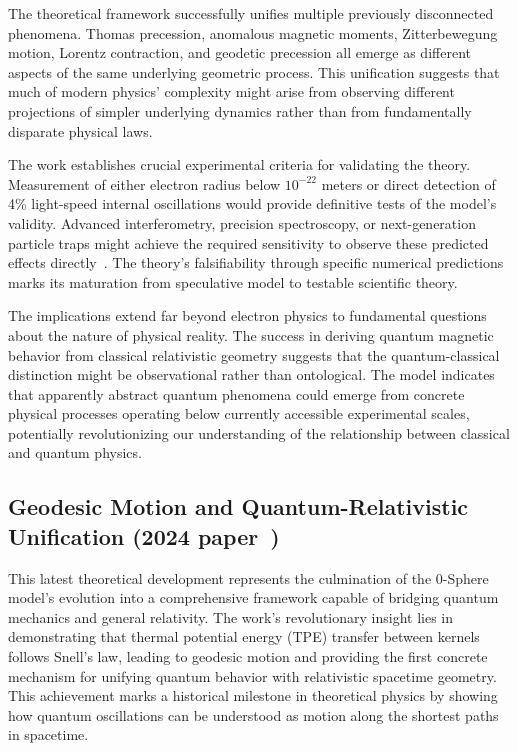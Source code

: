 \documentclass[%
 reprint,
 amsmath,amssymb,
 aps,
]{revtex4-1}
\numberwithin{equation}{section}%
\begin{document}
The theoretical framework successfully unifies multiple previously disconnected phenomena. Thomas precession, anomalous magnetic moments, Zitterbewegung motion, Lorentz contraction, and geodetic precession all emerge as different aspects of the same underlying geometric process. This unification suggests that much of modern physics' complexity might arise from observing different projections of simpler underlying dynamics rather than from fundamentally disparate physical laws.

The work establishes crucial experimental criteria for validating the theory. Measurement of either electron radius below $10^{-22}$ meters or direct detection of 4\% light-speed internal oscillations would provide definitive tests of the model's validity. Advanced interferometry, precision spectroscopy, or next-generation particle traps might achieve the required sensitivity to observe these predicted effects directly~\cite{dehmelt1988}. The theory's falsifiability through specific numerical predictions marks its maturation from speculative model to testable scientific theory.

The implications extend far beyond electron physics to fundamental questions about the nature of physical reality. The success in deriving quantum magnetic behavior from classical relativistic geometry suggests that the quantum-classical distinction might be observational rather than ontological. The model indicates that apparently abstract quantum phenomena could emerge from concrete physical processes operating below currently accessible experimental scales, potentially revolutionizing our understanding of the relationship between classical and quantum physics.

\subsection{Geodesic Motion and Quantum-Relativistic Unification (2024 paper~\cite{hanamura2411.0117})}

This latest theoretical development represents the culmination of the 0-Sphere model's evolution into a comprehensive framework capable of bridging quantum mechanics and general relativity. The work's revolutionary insight lies in demonstrating that thermal potential energy (TPE) transfer between kernels follows Snell's law, leading to geodesic motion and providing the first concrete mechanism for unifying quantum behavior with relativistic spacetime geometry. This achievement marks a historical milestone in theoretical physics by showing how quantum oscillations can be understood as motion along the shortest paths in spacetime.
\end{document}
